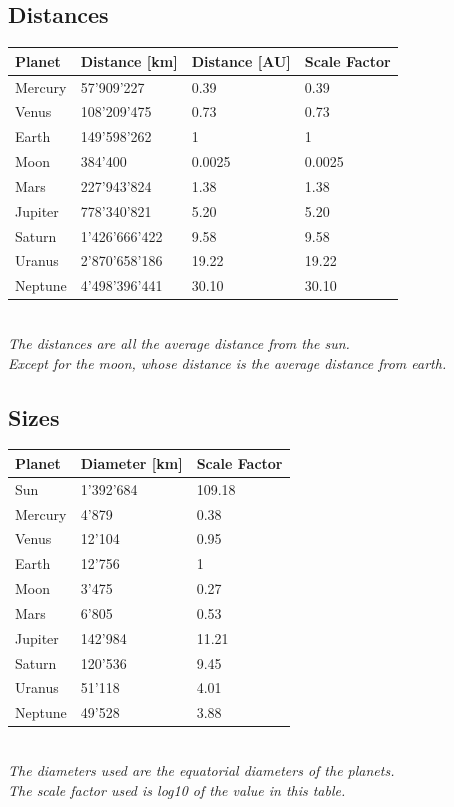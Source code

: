 \subsection{Distances}
\begin{center}
    \begin{tabular}{| l | l | l | l |}
    \hline
    Planet & Distance [km] & Distance [AU] & Scale Factor \\ \hline
    Mercury & 57'909'227 & 0.39 & 0.39 \\ \hline
    Venus & 108'209'475 & 0.73 & 0.73 \\ \hline
    Earth & 149'598'262 & 1 & 1 \\ \hline
    Moon & 384'400 & 0.0025 & 0.0025 \\ \hline
    Mars & 227'943'824 & 1.38 & 1.38 \\ \hline
    Jupiter & 778'340'821 & 5.20 & 5.20 \\ \hline
    Saturn & 1'426'666'422 & 9.58 & 9.58 \\ \hline
    Uranus & 2'870'658'186 & 19.22 & 19.22 \\ \hline
    Neptune & 4'498'396'441 & 30.10 & 30.10 \\
    \hline
    \end{tabular}\\
    \textit{The distances are all the average distance from the sun.\\
    Except for the moon, whose distance is the average distance from earth.}
\end{center}


\subsection{Sizes}
\begin{center}
    \begin{tabular}{| l | l | l |}
    \hline
    Planet & Diameter [km] & Scale Factor \\ \hline
    Sun & 1'392'684 & 109.18 \\ \hline
    Mercury & 4'879 & 0.38 \\ \hline
    Venus & 12'104 & 0.95 \\ \hline
    Earth & 12'756 & 1 \\ \hline
    Moon & 3'475 & 0.27 \\ \hline
    Mars & 6'805 & 0.53 \\ \hline
    Jupiter & 142'984 & 11.21 \\ \hline
    Saturn & 120'536 & 9.45 \\ \hline
    Uranus & 51'118 & 4.01 \\ \hline
    Neptune & 49'528 & 3.88 \\
    \hline
    \end{tabular}\\
    \textit{The diameters used are the equatorial diameters of the planets.\\
    The scale factor used is log10 of the value in this table.}
\end{center}


